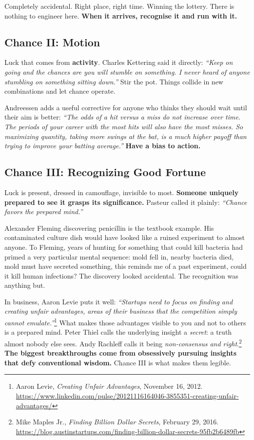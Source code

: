 Completely accidental. Right place, right time. Winning the lottery. There is nothing to engineer here. \textbf{When it arrives, recognise it and run with it.}

\subsection{Chance II: Motion}

Luck that comes from \textbf{activity}. Charles Kettering said it directly: \emph{``Keep on going and the chances are you will stumble on something. I never heard of anyone stumbling on something sitting down.''} Stir the pot. Things collide in new combinations and let chance operate.

Andreessen adds a useful corrective for anyone who thinks they should wait until their aim is better: \emph{``The odds of a hit versus a miss do not increase over time. The periods of your career with the most hits will also have the most misses. So maximizing quantity, taking more swings at the bat, is a much higher payoff than trying to improve your batting average.''} \textbf{Have a bias to action.}

\subsection{Chance III: Recognizing Good Fortune}

Luck is present, dressed in camouflage, invisible to most. \textbf{Someone uniquely prepared to see it grasps its significance.} Pasteur called it plainly: \emph{``Chance favors the prepared mind.''}

Alexander Fleming discovering penicillin is the textbook example. His contaminated culture dish would have looked like a ruined experiment to almost anyone. To Fleming, years of hunting for something that could kill bacteria had primed a very particular mental sequence: mold fell in, nearby bacteria died, mold must have secreted something, this reminds me of a past experiment, could it kill human infections? The discovery looked accidental. The recognition was anything but.

In business, Aaron Levie puts it well: \emph{``Startups need to focus on finding and creating unfair advantages, areas of their business that the competition simply cannot emulate.''}\footnote{Aaron Levie, \emph{Creating Unfair Advantages}, November 16, 2012. \url{https://www.linkedin.com/pulse/20121116164046-3855351-creating-unfair-advantages/}} What makes those advantages visible to you and not to others is a prepared mind. Peter Thiel calls the underlying insight a \emph{secret}: a truth almost nobody else sees. Andy Rachleff calls it being \emph{non-consensus and right}.\footnote{Mike Maples Jr., \emph{Finding Billion Dollar Secrets}, February 29, 2016. \url{https://blog.austinstartups.com/finding-billion-dollar-secrets-95fb2b6489fb}} \textbf{The biggest breakthroughs come from obsessively pursuing insights that defy conventional wisdom.} Chance III is what makes them legible.

